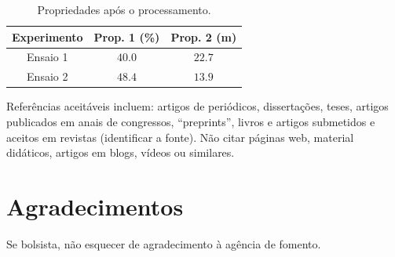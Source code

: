 \documentclass[
	article,			%
	10pt,				%
	oneside,			%
	a4paper,			%
  twocolumn,			%
	english,			%
	brazil,				%
	sumario=tradicional,
	]{abntex2}
\begin{document}
\begin{table}[h]
  \caption{Propriedades após o processamento.}
  \label{tab:example}
  \centering
  \begin{tabular}{ccc}
    \toprule
    Experimento & Prop. 1 (\%) & Prop. 2 (m)\\
    \midrule
    Ensaio 1 & $40.0$ & $22.7$ \\
    Ensaio 2 & $48.4$ & $13.9$ \\
    \bottomrule
  \end{tabular}
\end{table}

Referências aceitáveis incluem: artigos de periódicos, dissertações, teses, artigos
publicados em anais de congressos, ``preprints'', livros e artigos submetidos e aceitos em
revistas (identificar a fonte). Não citar páginas web, material didáticos, artigos em
blogs, vídeos ou similares.

\section{Agradecimentos}

Se bolsista, não esquecer de agradecimento à agência de fomento.


\end{document}
